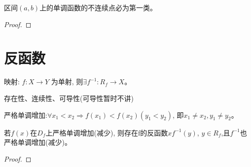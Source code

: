 \documentclass[lang=cn]{elegantbook}
\begin{document}
\begin{proposition}
    区间$(a, b)$上的单调函数的不连续点必为第一类。    
\end{proposition}
\begin{proof}
    
\end{proof}
\section{反函数}
映射: $f: X \to Y$ 为单射, 则$\exists f^{-1}: R_f \to X$。

存在性、连续性、可导性(可导性暂时不讲)

严格单调增加:$\forall x_1 < x_2 \Rightarrow f(x_1) < f(x_2)(y_1 < y_2)$, 即$x_1 \neq x_2, y_1 \neq y_2$。
\begin{theorem}[反函数存在定理]\label{theorem:inverse-func-exists}
    若$f(x)$在$D_f$上严格单调增加(减少), 则存在f的反函数$xf^{-1}(y)$, $y \in R_f $,且$f^{-1}$也严格单调增加(减少)。
\end{theorem}
\begin{proof}
    
\end{proof}
\end{document}
